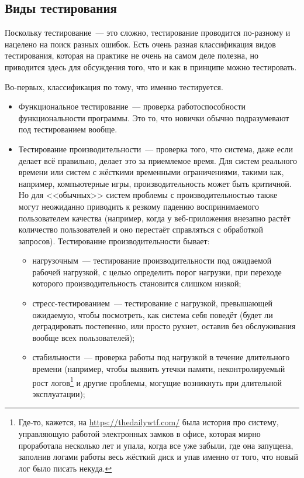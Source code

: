 \documentclass{../../text-style}
\begin{document}
\subsection{Виды тестирования}

Поскольку тестирование~--- это сложно, тестирование проводится по-разному и нацелено на поиск разных ошибок. Есть очень разная классификация видов тестирования, которая на практике не очень на самом деле полезна, но приводится здесь для обсуждения того, что и как в принципе можно тестировать.

Во-первых, классификация по тому, что именно тестируется.

\begin{itemize}
    \item Функциональное тестирование~--- проверка работоспособности функциональности программы. Это то, что новички обычно подразумевают под тестированием вообще.
    \item Тестирование производительности~--- проверка того, что система, даже если делает всё правильно, делает это за приемлемое время. Для систем реального времени или систем с жёсткими временными ограничениями, такими как, например, компьютерные игры, производительность может быть критичной. Но для <<обычных>> систем проблемы с производительностью также могут неожиданно приводить к резкому падению воспринимаемого пользователем качества (например, когда у веб-приложения внезапно растёт количество пользователей и оно перестаёт справляться с обработкой запросов). Тестирование производительности бывает:
    \begin{itemize}
        \item нагрузочным~--- тестирование производительности под ожидаемой рабочей нагрузкой, с целью определить порог нагрузки, при переходе которого производительность становится слишком низкой;
        \item стресс-тестированием~--- тестирование с нагрузкой, превышающей ожидаемую, чтобы посмотреть, как система себя поведёт (будет ли деградировать постепенно, или просто рухнет, оставив без обслуживания вообще всех пользователей);
        \item стабильности~--- проверка работы под нагрузкой в течение длительного времени (например, чтобы выявить утечки памяти, неконтролируемый рост логов\footnote{Где-то, кажется, на \url{https://thedailywtf.com/} была история про систему, управляющую работой электронных замков в офисе, которая мирно проработала несколько лет и упала, когда все уже забыли, где она запущена, заполнив логами работы весь жёсткий диск и упав именно от того, что новый лог было писать некуда.} и другие проблемы, могущие возникнуть при длительной эксплуатации);

\end{itemize}
\end{itemize}
\end{document}
